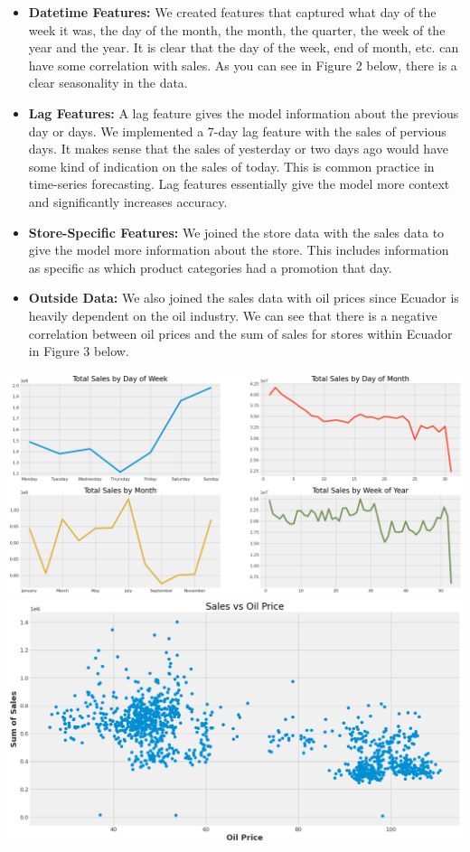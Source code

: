 \documentclass[12pt]{article}
\begin{document}
\begin{itemize}
    \item \textbf{Datetime Features:} We created features that captured what day of the week it was, the day of the month, the month, the quarter, the week of the year and the year. It is clear that the day of the week, end of month, etc. can have some correlation with sales. As you can see in Figure 2 below, there is a clear seasonality in the data.
    \item \textbf{Lag Features:} A lag feature gives the model information about the previous day or days. We implemented a 7-day lag feature with the sales of pervious days. It makes sense that the sales of yesterday or two days ago would have some kind of indication on the sales of today. This is common practice in time-series forecasting. Lag features essentially give the model more context and significantly increases accuracy.
    \item \textbf{Store-Specific Features:} We joined the store data with the sales data to give the model more information about the store. This includes information as specific as which product categories had a promotion that day.
    \item \textbf{Outside Data:} We also joined the sales data with oil prices since Ecuador is heavily dependent on the oil industry\cite{kaggle}. We can see that there is a negative correlation between oil prices and the sum of sales for stores within Ecuador in Figure 3 below.
\end{itemize}
\includegraphics[width=\textwidth]{figures/seasonality.png}
\includegraphics[width=\textwidth]{figures/oil.png}
\end{document}
